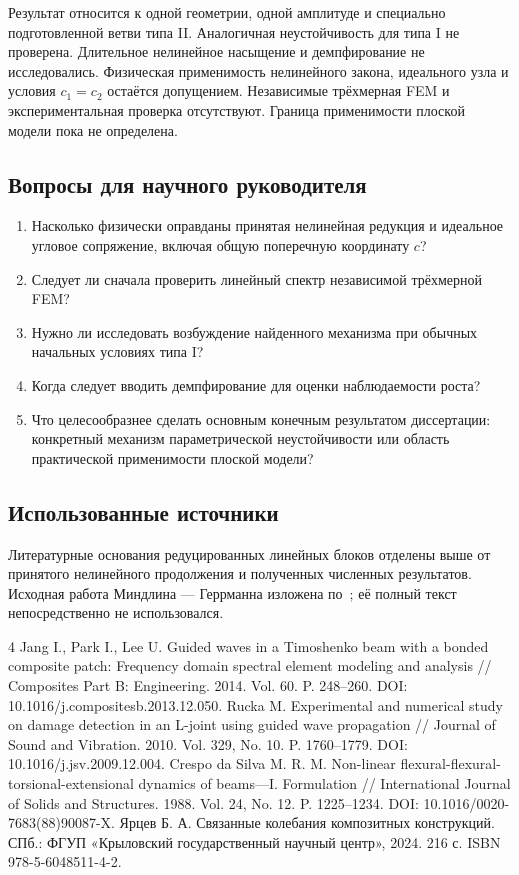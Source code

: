 \documentclass[11pt,a4paper]{article}
\begin{document}
Результат относится к одной геометрии, одной амплитуде и специально подготовленной ветви типа II. Аналогичная неустойчивость для типа I не проверена. Длительное нелинейное насыщение и демпфирование не исследовались. Физическая применимость нелинейного закона, идеального узла и условия $c_1=c_2$ остаётся допущением. Независимые трёхмерная FEM и экспериментальная проверка отсутствуют. Граница применимости плоской модели пока не определена.

\subsection*{Вопросы для научного руководителя}
\begin{enumerate}
\setlength{\itemsep}{1pt}
\item Насколько физически оправданы принятая нелинейная редукция и идеальное угловое сопряжение, включая общую поперечную координату $c$?
\item Следует ли сначала проверить линейный спектр независимой трёхмерной FEM?
\item Нужно ли исследовать возбуждение найденного механизма при обычных начальных условиях типа I?
\item Когда следует вводить демпфирование для оценки наблюдаемости роста?
\item Что целесообразнее сделать основным конечным результатом диссертации: конкретный механизм параметрической неустойчивости или область практической применимости плоской модели?
\end{enumerate}

\subsection*{Использованные источники}
Литературные основания редуцированных линейных блоков отделены выше от принятого нелинейного продолжения и полученных численных результатов. Исходная работа Миндлина --- Геррманна изложена по~\cite{jang,rucka}; её полный текст непосредственно не использовался.

{\raggedright
\begin{thebibliography}{4}
 Jang I., Park I., Lee U. Guided waves in a Timoshenko beam with a bonded composite patch: Frequency domain spectral element modeling and analysis // Composites Part B: Engineering. 2014. Vol. 60. P. 248--260. DOI: 10.1016/j.compositesb.2013.12.050.
 Rucka M. Experimental and numerical study on damage detection in an L-joint using guided wave propagation // Journal of Sound and Vibration. 2010. Vol. 329, No. 10. P. 1760--1779. DOI: 10.1016/j.jsv.2009.12.004.
 Crespo da Silva M. R. M. Non-linear flexural-flexural-torsional-extensional dynamics of beams---I. Formulation // International Journal of Solids and Structures. 1988. Vol. 24, No. 12. P. 1225--1234. DOI: 10.1016/0020-7683(88)90087-X.
 Ярцев Б. А. Связанные колебания композитных конструкций. СПб.: ФГУП «Крыловский государственный научный центр», 2024. 216 с. ISBN 978-5-6048511-4-2.
\end{thebibliography}
}
\end{document}
